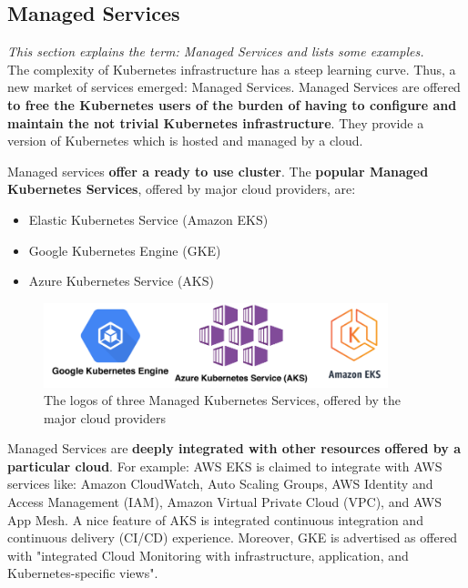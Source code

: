 \subsection{Managed Services}
\textit{This section explains the term: Managed Services and lists some examples.}
\\

The complexity of Kubernetes infrastructure has a steep learning curve. Thus, a new market of services emerged: Managed Services. Managed Services are offered \textbf{to free the Kubernetes users of the burden of having to configure and maintain the not trivial Kubernetes infrastructure}. They provide a version of Kubernetes which is hosted and managed by a cloud\cite{article-managed}.

Managed services \textbf{offer a ready to use cluster}. The \textbf{popular Managed Kubernetes Services}, offered by major cloud providers, are:
\begin{itemize}
\item Elastic Kubernetes Service (Amazon EKS)\cite{online-eks}
\item Google Kubernetes Engine (GKE)\cite{online-gke}
\item Azure Kubernetes Service (AKS)\cite{online-aks}
\end{itemize}

\begin{figure}[H]
    \centering
    \includegraphics[width=10cm]{figures/managed-k8s.png}
    \captionsetup{justification=centering,margin=2cm}
    \caption{The logos of three Managed Kubernetes Services, offered by the major cloud providers}
\end{figure}

Managed Services are \textbf{deeply integrated with other resources offered by a particular cloud}. For example: AWS EKS is claimed to integrate with AWS services like: Amazon CloudWatch, Auto Scaling Groups, AWS Identity and Access Management (IAM), Amazon Virtual Private Cloud (VPC), and AWS App Mesh\cite{online-eks}. A nice feature of AKS is integrated continuous integration and continuous delivery (CI/CD) experience\cite{online-aks}. Moreover, GKE is advertised as offered with "integrated Cloud Monitoring with infrastructure, application, and Kubernetes-specific views"\cite{online-gke}.

